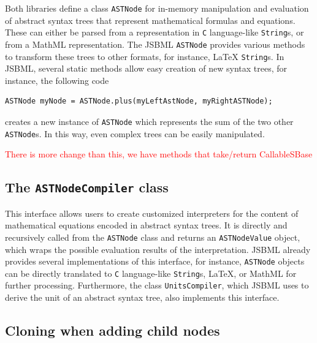 \documentclass[
  BCOR12mm,
  letterpaper,
  11pt,
  headsepline,
  pointlessnumbers,
  tablecaptionabove,
  onelinecaption,
  headinclude,
  appendixprefix,
  idxtotoc,
  bibtotoc,
  twoside,
  titlepage
]{scrartcl}
\begin{document}
Both libraries define a class \texttt{ASTNode} for in-memory manipulation and
evaluation of abstract syntax trees that represent mathematical formulas and
equations. These can either be parsed from a representation in \texttt{C}
language-like \texttt{String}s, or from a MathML representation. The JSBML
\texttt{ASTNode} provides various methods to transform these trees to other
formats, for instance, \LaTeX{}
 \texttt{String}s. In JSBML, several static
methods allow easy creation of new syntax trees, for instance, the following
code
\begin{lstlisting}
ASTNode myNode = ASTNode.plus(myLeftAstNode, myRightASTNode);
\end{lstlisting}
creates a new instance of \texttt{ASTNode} which represents the sum of the two
other \texttt{ASTNode}s. In this way, even complex trees can be easily
manipulated.

\textcolor{red}{There is more change than this, we have methods that take/return
CallableSBase}

\subsection{The \texttt{ASTNodeCompiler} class}

This interface allows users to create customized interpreters for the
content of mathematical equations encoded in abstract syntax trees. It
is directly and recursively called from the \texttt{ASTNode} class and returns
an \texttt{ASTNodeValue}
 object,
which wraps the possible evaluation results of the interpretation.
JSBML already provides several implementations of this
interface, for instance, \texttt{ASTNode} objects can be directly translated to
\texttt{C} language-like \texttt{String}s,
\LaTeX, or MathML for further processing.
Furthermore, the class \texttt{UnitsCompiler},
which JSBML uses to derive the unit of an abstract syntax tree, also implements
this interface.

\subsection{Cloning when adding child nodes}
\end{document}
